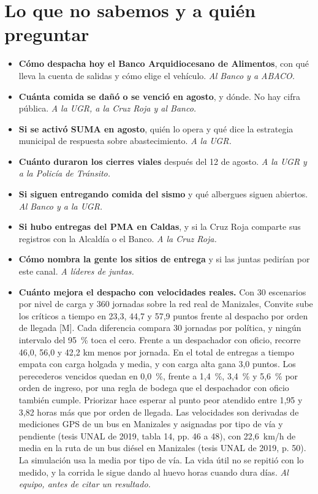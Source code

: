 \documentclass[11pt,letterpaper,parskip=half-]{scrartcl}
\newcommand{\marca}[1]{\textcolor{ceniza}{\footnotesize[#1]}}   %
\begin{document}
\section{Lo que no sabemos y a quién preguntar}\label{sec:nosabemos}

\begin{itemize}[leftmargin=1.2em]
\item \textbf{Cómo despacha hoy el Banco Arquidiocesano de Alimentos}, con qué lleva la cuenta de salidas y cómo elige el vehículo. \emph{Al Banco y a ABACO.}
\item \textbf{Cuánta comida se dañó o se venció en agosto}, y dónde. No hay cifra pública. \emph{A la UGR, a la Cruz Roja y al Banco.}
\item \textbf{Si se activó SUMA en agosto}, quién lo opera y qué dice la estrategia municipal de respuesta sobre abastecimiento. \emph{A la UGR.}
\item \textbf{Cuánto duraron los cierres viales} después del 12 de agosto. \emph{A la UGR y a la Policía de Tránsito.}
\item \textbf{Si siguen entregando comida del sismo} y qué albergues siguen abiertos. \emph{Al Banco y a la UGR.}
\item \textbf{Si hubo entregas del PMA en Caldas}, y si la Cruz Roja comparte sus registros con la Alcaldía o el Banco. \emph{A la Cruz Roja.}
\item \textbf{Cómo nombra la gente los sitios de entrega} y si las juntas pedirían por este canal. \emph{A líderes de juntas.}
\item \textbf{Cuánto mejora el despacho con velocidades reales.} Con 30 escenarios por nivel de carga y 360 jornadas sobre la red real de Manizales, Convite sube los críticos a tiempo en 23,3, 44,7 y 57,9 puntos frente al despacho por orden de llegada \marca{M}. Cada diferencia compara 30 jornadas por política, y ningún intervalo del 95~\% toca el cero. Frente a un despachador con oficio, recorre 46,0, 56,0 y 42,2 km menos por jornada. En el total de entregas a tiempo empata con carga holgada y media, y con carga alta gana 3,0 puntos. Los perecederos vencidos quedan en 0,0~\%, frente a 1,4~\%, 3,4~\% y 5,6~\% por orden de ingreso, por una regla de bodega que el despachador con oficio también cumple. Priorizar hace esperar al punto peor atendido entre 1,95 y 3,82 horas más que por orden de llegada. Las velocidades son derivadas de mediciones GPS de un bus en Manizales y asignadas por tipo de vía y pendiente (tesis UNAL de 2019, tabla 14, pp. 46 a 48), con 22,6~km/h de media en la ruta de un bus diésel en Manizales (tesis UNAL de 2019, p. 50). La simulación usa la media por tipo de vía. La vida útil no se repitió con lo medido, y la corrida le sigue dando al huevo horas cuando dura días. \emph{Al equipo, antes de citar un resultado.}
\end{itemize}
\end{document}
